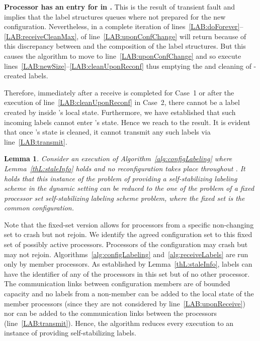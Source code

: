 \documentclass[11pt]{article}
\newtheorem{lemma}[theorem]{Lemma}
\newenvironment{proof}{\noindent{\bf Proof.}}{\hfill}
\begin{document}
\begin{proof}
 \textbf{Processor  has an entry for  in .}
This is the result of transient fault and implies that the label structures queues where not prepared for the new configuration.
Nevertheless, in a complete iteration of lines~\ref{LAB:doForever}--\ref{LAB:receiveCleanMax},  of line~\ref{LAB:uponConfChange} will return  because of this discrepancy between  and the composition of the label structures.
But this causes the algorithm to move to line~\ref{LAB:uponConfChange} and so execute lines~\ref{LAB:newSize}--\ref{LAB:cleanUponReconf} thus emptying the  and cleaning  of -created labels.

Therefore, immediately after a receive is completed for Case~1 or after the execution of line~\ref{LAB:cleanUponReconf} in Case~2, there cannot be a label created by  inside 's local state.
Furthermore, we have established that such incoming labels cannot enter 's state.
Hence we reach to the result.
It is evident that once 's state is cleaned, it cannot transmit any such labels via line~\ref{LAB:transmit}.
\end{proof}


\begin{lemma} \label{thL:map2SSVS}
Consider an execution  of Algorithm~\ref{alg:configLabeling} where Lemma~\ref{thL:staleInfo} holds and no reconfiguration takes place throughout . 
It holds that this instance of the problem of providing a self-stabilizing labeling scheme in the dynamic setting can be reduced to the one of the problem of a fixed processor set self-stabilizing labeling scheme problem, where the fixed set is the common configuration. 
\end{lemma}

\begin{proof}
Note that the fixed-set version allows for processors from a specific non-changing set to crash but not rejoin.
We identify the agreed configuration set to this fixed set of possibly active processors.
Processors of the configuration may crash but may not rejoin.
Algorithms~\ref{alg:configLabeling} and~\ref{alg:receiveLabels} are run only by member processors.
As established by Lemma~\ref{thL:staleInfo}, labels can have the identifier of any of the processors in this set but of no other processor.
The communication links between configuration members are of bounded capacity and no labels from a non-member can be added to the local state of the member processors (since they are not considered by line~\ref{LAB:uponReceive}) nor can be added to the communication links between the processors (line~\ref{LAB:transmit}).
Hence, the algorithm reduces every execution  to an instance of providing self-stabilizing labels. 
\end{proof}
\vspace{.5em}
\end{document}
